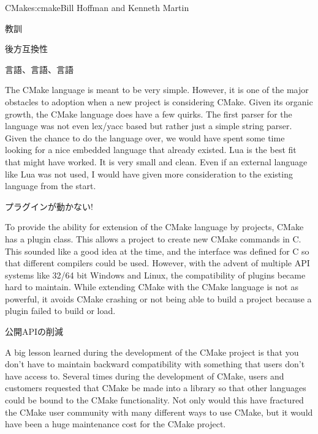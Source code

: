\begin{aosachapter}{CMake}{s:cmake}{Bill Hoffman and Kenneth Martin}
\begin{aosasect1}{教訓}
\begin{aosasect2}{後方互換性}
\end{aosasect2}

\begin{aosasect2}{言語、言語、言語}

The CMake language is meant to be very simple. However, it is one of
the major obstacles to adoption when a new project is considering
CMake. Given its organic growth, the CMake language does have a few
quirks. The first parser for the language was not even lex/yacc based
but rather just a simple string parser. Given the chance to do the
language over, we would have spent some time looking for a nice
embedded language that already existed. Lua is the best fit that might
have worked. It is very small and clean. Even if an external language
like Lua was not used, I would have given more consideration to the
existing language from the start.

\end{aosasect2}

\begin{aosasect2}{プラグインが動かない!}

To provide the ability for extension of the CMake language by
projects, CMake has a plugin class. This allows a project to create
new CMake commands in C. This sounded like a good idea at
the time, and the interface was defined for C so that different
compilers could be used. However, with the advent of multiple API
systems like 32/64 bit Windows and Linux, the compatibility of plugins
became hard to maintain. While extending CMake with the CMake language
is not as powerful, it avoids CMake crashing or not being able
to build a project because a plugin failed to build or load.

\end{aosasect2}

\begin{aosasect2}{公開APIの削減}

A big lesson learned during the development of the CMake project is
that you don't have to maintain backward compatibility with something
that users don't have access to. Several times during the development
of CMake, users and customers requested that CMake be made into a
library so that other languages could be bound to the CMake
functionality. Not only would this have fractured the CMake user
community with many different ways to use CMake, but it would have
been a huge maintenance cost for the CMake project.

\end{aosasect2}

\end{aosasect1}

\end{aosachapter}
